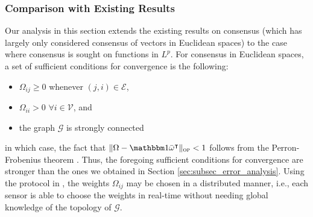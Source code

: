\subsubsection{Comparison with Existing Results}
Our analysis in this section extends the existing results on consensus (which has largely only considered consensus of vectors in Euclidean spaces)
to the case where consensus is sought on functions in $L^p$. For consensus in Euclidean spaces, a set of sufficient conditions for convergence is the following: 
\begin{itemize}
\item $\Omega_{ij} \geq 0$ whenever $(j,i)\in \mathcal E$,
\item $\Omega_{ii}>0$ ${\forall i\in\mathcal V}$, and 
\item the graph $\mathcal G$ is strongly connected
\end{itemize}
in which case, the fact that $\|{\Omega - \mathbbm 1 \bar{\omega}^\intercal} \|_{\textsc{op}}<1$ follows from the Perron-Frobenius theorem \cite[Lemma 1]{corless2012consensus}. Thus, the foregoing sufficient conditions for convergence are stronger than the ones we obtained in Section \ref{sec:subsec_error_analysis}.
Using the protocol in \cite{corless2012consensus}, the weights $\Omega_{ij}$ may be chosen in a distributed manner, i.e., each sensor is able to choose the weights in real-time without needing global knowledge of the topology of $\mathcal G$.




